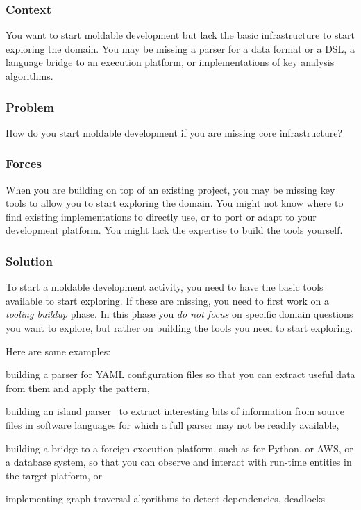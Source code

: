 \documentclass[sigconf]{acmart}
\renewcommand{\nbc}[3]{} %
\newcommand\kh[1]{\nbc{Konrad}{#1}{violet}}
\newcommand{\pattern}[1]{\emph{\nameref{pat:#1}}\xspace}
\begin{document}
\kh{A close second (of a non-pattern) is "Tooling
Buildup". Has anyone outside feenk ever done this, beyond tweaking some
parser? These two (non-) patterns are probably the biggest obstacle to
getting started with Moldable Development. If your domain or your tech
stack is not supported by GT out of the box, testing the idea is a very
costly endeavor.}

\subsubsection*{Context}
You want to start moldable development but lack the basic infrastructure to start exploring the domain.
You may be missing a parser for a data format or a DSL, a language bridge to an execution platform, or implementations of key analysis algorithms. 

\subsubsection*{Problem}
How do you start moldable development if you are missing core infrastructure?

\subsubsection*{Forces}
When you are building on top of an existing project, you may be missing key tools to allow you to start exploring the domain.
You might not know where to find existing implementations to directly use, or to port or adapt to your development platform.
You might lack the expertise to build the tools yourself.

\subsubsection*{Solution}
To start a moldable development activity, you need to have the basic tools available to start exploring.
If these are missing, you need to first work on a \emph{tooling buildup} phase.
In this phase you \emph{do not focus} on specific domain questions you want to explore, but rather on building the tools you need to start exploring.

Here are some examples:
\begin{inparaenum}[(i)]
\item building a parser for YAML configuration files so that you can extract useful data from them and apply the \pattern{moldableDataWrapper} pattern,
\item building an island parser~\cite{Kurs14b} to extract interesting bits of information from source files in software languages for which a full parser may not be readily available,
\item building a bridge to a foreign execution platform, such as for Python, or AWS, or a database system, so that you can observe and interact with run-time entities in the target platform, or
\item implementing graph-traversal algorithms to detect dependencies, deadlocks \etc
\end{inparaenum}
\end{document}
